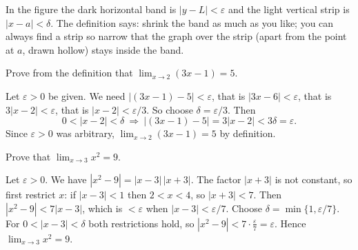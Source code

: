 \begin{center}
\end{center}
In the figure the dark horizontal band is $|y-L|<\varepsilon$ and the light vertical strip is $|x-a|<\delta$. The definition says: shrink the band as much as you like; you can always find a strip so narrow that the graph over the strip (apart from the point at $a$, drawn hollow) stays inside the band.

\begin{example}
Prove from the definition that $\lim_{x\to2}(3x-1)=5$.
\end{example}
\begin{solution}
Let $\varepsilon>0$ be given. We need $|(3x-1)-5|<\varepsilon$, that is $|3x-6|<\varepsilon$, that is $3|x-2|<\varepsilon$, that is $|x-2|<\varepsilon/3$. So choose $\delta=\varepsilon/3$. Then
\[
0<|x-2|<\delta\ \Longrightarrow\ |(3x-1)-5|=3|x-2|<3\delta=\varepsilon .
\]
Since $\varepsilon>0$ was arbitrary, $\lim_{x\to2}(3x-1)=5$ by definition.
\end{solution}

\begin{example}[A quadratic]
Prove that $\lim_{x\to3}x^2=9$.
\end{example}
\begin{solution}
Let $\varepsilon>0$. We have $|x^2-9|=|x-3|\,|x+3|$. The factor $|x+3|$ is not constant, so first restrict $x$: if $|x-3|<1$ then $2<x<4$, so $|x+3|<7$. Then $|x^2-9|<7|x-3|$, which is $<\varepsilon$ when $|x-3|<\varepsilon/7$. Choose $\delta=\min\{1,\varepsilon/7\}$. For $0<|x-3|<\delta$ both restrictions hold, so $|x^2-9|<7\cdot\frac{\varepsilon}{7}=\varepsilon$. Hence $\lim_{x\to3}x^2=9$.
\end{solution}

